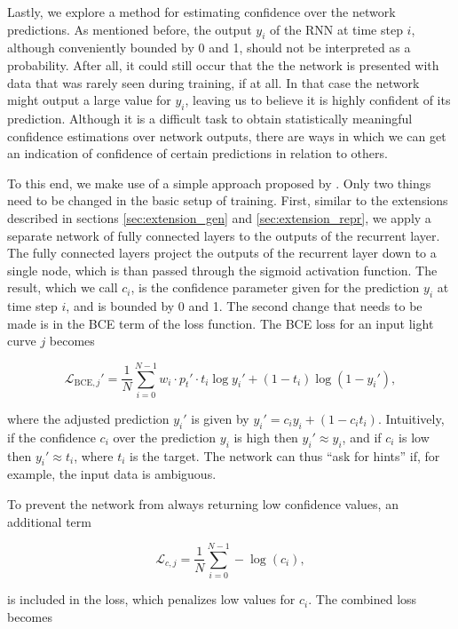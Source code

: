 Lastly, we explore a method for estimating confidence over the network predictions. As mentioned before, the output $y_i$ of the RNN at time step $i$, although conveniently bounded by 0 and 1, should not be interpreted as a probability. After all, it could still occur that the the network is presented with data that was rarely seen during training, if at all. In that case the network might output a large value for $y_i$, leaving us to believe it is highly confident of its prediction. Although it is a difficult task to obtain statistically meaningful confidence estimations over network outputs, there are ways in which we can get an indication of confidence of certain predictions in relation to others.

To this end, we make use of a simple approach proposed by \cite{devries2018learning}. Only two things need to be changed in the basic setup of training. First, similar to the extensions described in sections \ref{sec:extension_gen} and \ref{sec:extension_repr}, we apply a separate network of fully connected layers to the outputs of the recurrent layer. The fully connected layers project the outputs of the recurrent layer down to a single node, which is than passed through the sigmoid activation function. The result, which we call $c_i$, is the confidence parameter given for the prediction $y_i$ at time step $i$, and is bounded by 0 and 1. The second change that needs to be made is in the BCE term of the loss function. The BCE loss for an input light curve $j$ becomes

\begin{equation}
    \mathcal{L}_{\text{BCE}, j}' = \frac{1}{N} \sum_{i=0}^{N-1} w_i \cdot p_t' \cdot t_i \log y_i' + (1-t_i) \log (1-y_i'),
\end{equation}

\noindent where the adjusted prediction $y_i'$ is given by $y_i' = c_i y_i +  (1-c_i t_i)$. Intuitively, if the confidence $c_i$ over the prediction $y_i$ is high then $y_i' \approx y_i$, and if $c_i$ is low then $y_i' \approx t_i$, where $t_i$ is the target. The network can thus ``ask for hints'' if, for example, the input data is ambiguous. 

To prevent the network from always returning low confidence values, an additional term 

\begin{equation}
    \mathcal{L}_{c, j} = \frac{1}{N} \sum_{i=0}^{N-1} - \log(c_i),
\end{equation}

\noindent is included in the loss, which penalizes low values for $c_i$. The combined loss becomes

